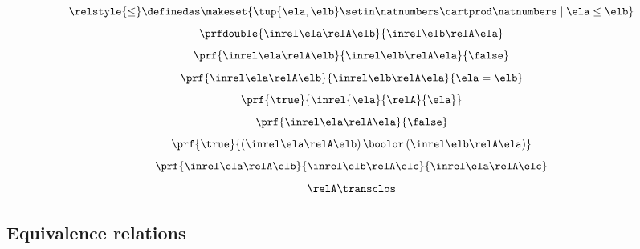 \begin{forslides}
\begin{equation}
    \end{equation}
    \begin{equation}
        \label{eq:slides_session2_rel_149}
        \relstyle{\leq} \definedas  \makeset{\tup{\ela,\elb}\setin \natnumbers\cartprod \natnumbers\mid \ela \leq \elb}
    \end{equation}
    \begin{equation}
        \label{eq:slides_session2_rel_150}
        \prfdouble{
            \inrel \ela \relA \elb
        }{
            \inrel \elb \relA \ela
        }
    \end{equation}
    \begin{equation}
        \label{eq:slides_session2_rel_151}
        \prf{
            \inrel \ela \relA \elb
        }{
            \inrel \elb \relA \ela
        }{
            \false
        }
    \end{equation}
    \begin{equation}
        \label{eq:slides_session2_rel_152}
        \prf{
            \inrel \ela \relA \elb
        }{
            \inrel \elb \relA \ela
        }{
            \ela = \elb
        }
    \end{equation}
    \begin{equation}
        \label{eq:slides_session2_rel_153}
        \prf{\true}{\inrel{\ela}{\relA}{\ela}}
    \end{equation}
    \begin{equation}
        \label{eq:slides_session2_rel_154}
        \prf{
            \inrel \ela \relA \ela
        }{
            \false
        }
    \end{equation}
    \begin{equation}
        \label{eq:slides_session2_rel_155}
        \prf{
            \true
        }{
            (\inrel\ela\relA\elb )\,\boolor\, (\inrel\elb\relA\ela)
        }
    \end{equation}
    \begin{equation}
        \label{eq:slides_session2_rel_156}
        \prf{
            \inrel \ela \relA \elb
        }{
            \inrel \elb \relA \elc
        }{
            \inrel \ela \relA \elc
        }
    \end{equation}
    \begin{equation}
        \label{eq:slides_session2_rel_157}
        \relA\transclos
    \end{equation}

    \subsection{Equivalence relations}


\end{forslides}
